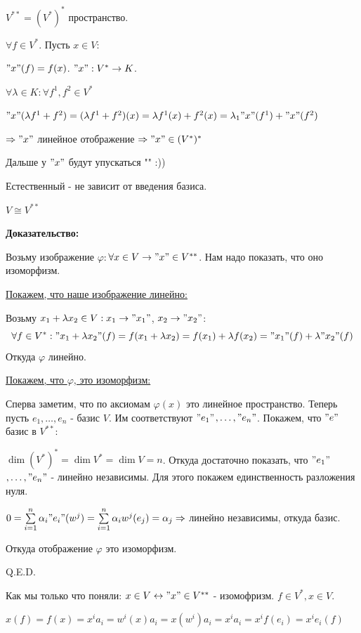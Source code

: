  $V^{**} = (V^*)^*$  пространство.

$\forall f \in V^*$. Пусть $x \in V$:

$"x"(f) = f(x)$. $"x": V^* \rightarrow K$.

$\forall \lambda \in K: \forall f^1,f^2 \in V^*$

$"x"(\lambda f^1+f^2) = (\lambda f^1 + f^2)(x) = \lambda f^1(x) + f^2(x) = \lambda_1 "x"(f^1) + "x"(f^2)$

$\Rightarrow "x"$ линейное отображение $\Rightarrow"x" \in (V^*)^*$

Дальше у $"x"$ будут упускаться "" :))


Естественный - не зависит от введения базиса.

$V \cong V^{**}$

\textbf{Доказательство:}

Возьму изображение $\varphi:$$\forall x \in V \rightarrow "x"\in V^{**}$. Нам надо показать, что оно изоморфизм.

\uline{Покажем, что наше изображение линейно:}

Возьму $x_1 + \lambda x_2 \in V: x_1 \rightarrow "x_1"$, $x_2 \rightarrow "x_2"$:
$$\forall f\in V^*: "x_1+\lambda x_2"(f) = f(x_1+\lambda x_2) = f(x_1) + \lambda f(x_2) = "x_1"(f) + \lambda"x_2"(f) $$
Откуда $\varphi$ линейно.

\uline{Покажем, что $\varphi$, это изоморфизм:}

Сперва заметим, что по аксиомам $\varphi(x)$ это линейное пространство. Теперь пусть $e_1,\ldots, e_n$ - базис $V$. Им соответствуют $ "e_1"$$,\ldots, "e_n"$. Покажем, что $"e"$ базис в $V^{**}$:

 $\dim (V^*)^* = \dim V^* = \dim V = n$. Откуда достаточно показать, что $"e_1"$ $,\ldots, "e_n"$ - линейно независимы. Для этого покажем единственность разложения нуля.

$0= \sum\limits_{i=1}^n \alpha_i "e_i"(w^j)=\sum\limits_{i=1}^n\alpha_i w^j(e_j) = \alpha_j \Rightarrow$ линейно независимы, откуда базис.

Откуда отображение $\varphi$ это изоморфизм.

\hfill Q.E.D.

Как мы только что поняли: $x \in V \leftrightarrow "x" \in V^{**}$ - изомофризм. $f\in V^{*}, x \in V$.

$x(f)= f(x) = x^i a_i = w^i(x) a_i = x(w^i)a_i =x^ia_i=x^i f(e_i)=x^ie_i(f)$

